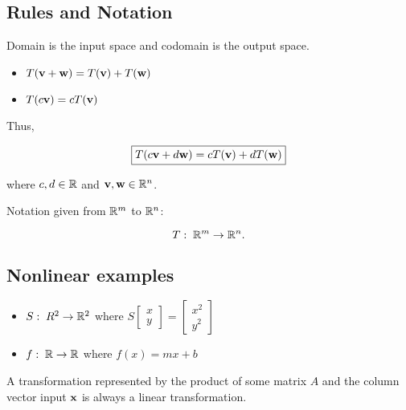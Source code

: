 \subsection{Rules and Notation}

Domain is the input space and codomain is the output space.

\begin{itemize}
    \item $T(\textbf{v}+\textbf{w})=T(\textbf{v})+T(\textbf{w})$
    \item $T(c\textbf{v})=cT(\textbf{v})$
\end{itemize}

Thus,

\[\boxed{T(c\textbf{v}+d\textbf{w})=cT(\textbf{v})+dT(\textbf{w})}\]

where $c,d\in \mathbb{R}$ and $\textbf{v},\textbf{w}\in \mathbb{R}^n$.\newline

Notation given from $\mathbb{R}^m$ to $\mathbb{R}^n$:

\[T:\; \mathbb{R}^m\rightarrow \mathbb{R}^n.\]

\subsection{Nonlinear examples}

\begin{itemize}
    \item $S:\;R^2\rightarrow\mathbb{R}^2$ where $S\begin{bmatrix}x\\y\end{bmatrix}=\begin{bmatrix}x^2\\y^2\end{bmatrix}$
    \item $f:\;\mathbb{R}\rightarrow\mathbb{R}$ where $f(x)=mx+b$
\end{itemize}

A transformation represented by the product of some matrix $A$ and the column vector input $\textbf{x}$ is always a linear transformation.